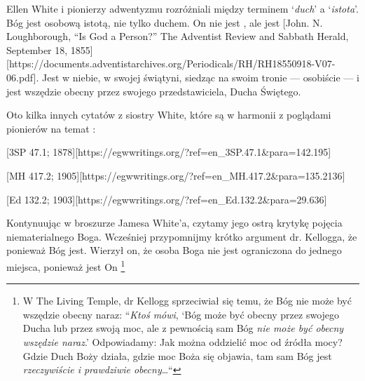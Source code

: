 Ellen White i pionierzy adwentyzmu rozróżniali między terminem ‘\textit{duch}’ a ‘\textit{istota}’. Bóg jest osobową istotą, nie tylko duchem. On nie jest , ale jest [John. N. Loughborough, “Is God a Person?” The Adventist Review and Sabbath Herald, September 18, 1855][https://documents.adventistarchives.org/Periodicals/RH/RH18550918-V07-06.pdf]. Jest w niebie, w swojej świątyni, siedząc na swoim tronie — osobiście — i jest wszędzie obecny przez swojego przedstawiciela, Ducha Świętego.

Oto kilka innych cytatów z siostry White, które są w harmonii z poglądami pionierów na temat :

[3SP 47.1; 1878][https://egwwritings.org/?ref=en\_3SP.47.1&para=142.195]

[MH 417.2; 1905][https://egwwritings.org/?ref=en\_MH.417.2&para=135.2136]

[Ed 132.2; 1903][https://egwwritings.org/?ref=en\_Ed.132.2&para=29.636]


Kontynuując w broszurze Jamesa White'a, czytamy jego ostrą krytykę pojęcia niematerialnego Boga. Wcześniej przypomnijmy krótko argument dr. Kellogga, że ponieważ Bóg jest. Wierzył on, że osoba Boga nie jest ograniczona do jednego miejsca, ponieważ jest On \footnote{W The Living Temple, dr Kellogg sprzeciwiał się temu, że Bóg nie może być wszędzie obecny naraz: “\textit{Ktoś mówi}, ‘Bóg może być obecny przez swojego Ducha lub przez swoją moc, ale z pewnością sam Bóg \textit{nie może być obecny wszędzie naraz}.’ Odpowiadamy: Jak można oddzielić moc od źródła mocy? Gdzie Duch Boży działa, gdzie moc Boża się objawia, tam sam Bóg jest \textit{rzeczywiście i prawdziwie obecny}…“}

